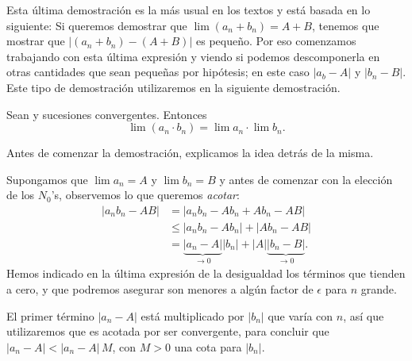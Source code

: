 Esta última demostración es la más usual en los textos y está basada en lo siguiente: Si queremos demostrar que $\lim(a_n+b_n)=A+B$, tenemos que mostrar que $|(a_n+b_n)-(A+B)|$ es pequeño. Por eso comenzamos trabajando con esta última expresión y viendo si podemos descomponerla en otras cantidades que sean pequeñas por hipótesis; en este caso $|a_b-A|$ y $|b_n-B|$. Este tipo de demostración utilizaremos en la siguiente demostración.

\begin{proposition}\label{P:suc-lim-prod}
    Sean \sucan y \sucbn sucesiones convergentes. Entonces
    \[
    \lim (a_n\cdot b_n) = \lim a_n \cdot \lim b_n.
    \]
\end{proposition}

Antes de comenzar la demostración, explicamos la idea detrás de la misma.

Supongamos que $\lim a_n = A$ y $\lim b_n = B$ y antes de comenzar con la elección de los $N_0$'s, observemos lo que queremos \emph{acotar}:
\begin{align*}
|a_n b_n - A B | 
&= | a_n b_n - A b_n  + A b_n - AB| 
\\
&\le  | a_n b_n - A b_n | + |A b_n - AB| 
\\
&= \underbrace{|a_n - A|}_{\to 0} |b_n| + |A| \underbrace{|b_n - B|}_{\to 0}.
\end{align*}
Hemos indicado en la última expresión de la desigualdad los términos que tienden a cero, y que podremos asegurar son menores a algún factor de $\epsilon$ para $n$ grande.

El primer término $|a_n-A|$ está multiplicado por $|b_n|$ que varía con $n$, así que utilizaremos que \sucbn es acotada por ser convergente, para concluir que $|a_n-A| <|a_n-A|\, M$, con $M>0$ una cota para $|b_n|$.

